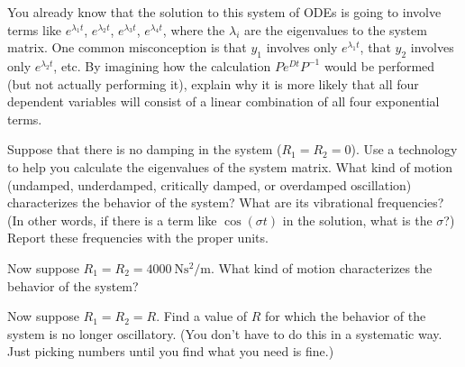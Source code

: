 \documentclass[boxes]{gsypset}
\begin{document}
\begin{problem}
\begin{subproblems}
\begin{solution}
			\end{solution}
		\subproblem 
			You already know that the solution to this system of ODEs is going to involve terms like
		  $e^{\lambda_1 t}$, $e^{\lambda_2 t}$, $e^{\lambda_3 t}$, $e^{\lambda_4 t}$, 
		  where the $\lambda_i$ are the eigenvalues to the system matrix. 
		  One common misconception is that $y_1$ involves only $e^{\lambda_1 t}$, 
		  that $y_2$ involves only $e^{\lambda_2 t}$, etc. 
		  By imagining how the calculation $Pe^{Dt}P^{-1}$ would be performed 
		  (but not actually performing it), 
		  explain why it is more likely that all four dependent variables will consist of a 
		  linear combination of all four exponential terms.
			\begin{solution}
				
			\end{solution}
		\subproblem 
			Suppose that there is no damping in the system ($R_1=R_2=0$). 
			Use a technology to help you calculate the eigenvalues of the system matrix. 
			What kind of motion (undamped, underdamped, critically damped, or overdamped oscillation)
			characterizes the behavior of the system? 
			What are its vibrational frequencies? 
			(In other words, if there is a term like $\cos(\sigma t)$ in the solution, 
			what is the $\sigma$?) 
			Report these frequencies with the proper units.
			\begin{solution}
				
			\end{solution}
		\subproblem 
			Now suppose $R_1=R_2=\SI{4000}{\N\s^2\per\m}$. 
			What kind of motion characterizes the behavior of the system?
			\begin{solution}
				
			\end{solution}
		\subproblem 
			Now suppose $R_1=R_2=R$. 
			Find a value of $R$ for which the behavior of the system is no longer oscillatory. 
			(You don't have to do this in a systematic way. 
			Just picking numbers until you find what you need is fine.)
			\begin{solution}
				
			\end{solution}
	\end{subproblems}
\end{problem}
\end{document}
